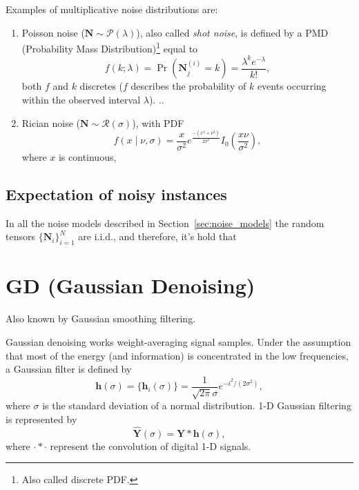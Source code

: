 \documentclass{article}
\begin{document}
Examples of multiplicative noise distributions are:

\begin{enumerate}
\item Poisson noise ($\mathbf{N}\sim\mathcal{P}(\lambda)$), also
  called \emph{shot noise}, is defined by a PMD (Probability Mass
  Distribution)\footnote{Also called discrete PDF.} equal to
  \begin{equation}
    f(k; \lambda) = \Pr({\mathbf N}^{(i)}_j{=}k) = \frac{\lambda^k e^{-\lambda}}{k!},
  \end{equation}
  both $f$ and $k$ discretes ($f$ describes the probability of $k$
  events occurring within the observed interval $\lambda$).  ..
\item Rician noise ($\mathbf{N}\sim\mathcal{R}(\sigma)$), with PDF
  \begin{equation}
    f(x\mid\nu,\sigma) = \frac{x}{\sigma^2}e^{\frac{-(x^2+\nu^2)}{2\sigma^2}}I_0\left(\frac{x\nu}{\sigma^2}\right),
  \end{equation}
  where $x$ is continuous, 
\end{enumerate}

\subsection{Expectation of noisy instances}
In all the noise models described in Section~\ref{sec:noise_models}
the random tensors $\{{\mathbf N}_i\}_{i=1}^N$ are i.i.d., and therefore,
it's hold that




\section{GD (Gaussian Denoising)}

Also known by Gaussian smoothing filtering.

Gaussian denoising works weight-averaging signal samples. Under the
assumption that most of the energy (and information) is concentrated
in the low frequencies, a Gaussian filter is defined by
\begin{equation}
  \mathbf{h}(\sigma) = \{\mathbf{h}_i(\sigma)\} = \frac{1}{\sqrt{2\pi}\sigma}e^{{-i}^2/(2\sigma^2)},
\end{equation}
where $\sigma$ is the standard deviation of a normal
distribution. 1-D Gaussian filtering is represented by
\begin{equation}
  \hat{\mathbf{Y}}(\sigma) = \mathbf{Y}*\mathbf{h}(\sigma),
  \label{eq:GF}
\end{equation}
where $\cdot*\cdot$ represent the convolution of digital 1-D signals.
\end{document}
